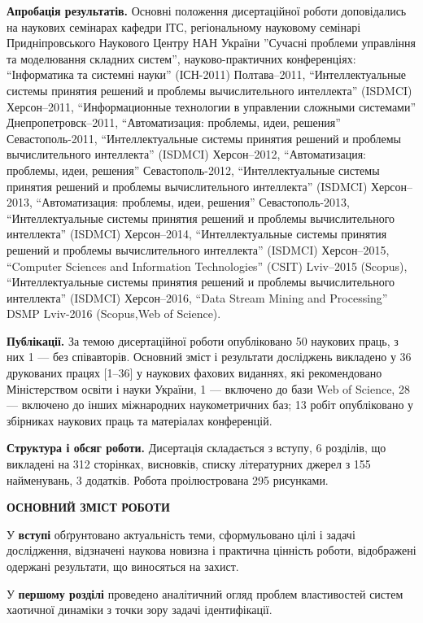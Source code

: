 \documentclass[a4paper,13pt]{atuaref}
\newcommand{\xsect}[1]{\vspace{0.15ex}\begin{center}\textbf{#1}\end{center}\vspace{4pt}\penalty10000}
\begin{document}
\smallskip
\textbf{Апробація результатів.}
Основні положення дисертаційної роботи доповідались на наукових
семінарах кафедри ІТС,
регіональному науковому семінарі Придніпровського Наукового Центру НАН України
''Сучасні проблеми управління та моделювання складних систем'',
науково-практичних конференціях:
``Інформатика та системні науки'' (ІСН-2011) Полтава--2011,
``Интеллектуальные системы принятия решений и проблемы вычислительного интеллекта'' (ISDMCI) Херсон--2011,
``Информационные технологии в управлении сложными системами'' Днепропетровск--2011,
``Автоматизация: проблемы, идеи, решения'' Севастополь-2011,
``Интеллектуальные системы принятия решений и проблемы вычислительного интеллекта'' (ISDMCI) Херсон--2012,
``Автоматизация: проблемы, идеи, решения'' Севастополь-2012,
``Интеллектуальные системы принятия решений и проблемы вычислительного интеллекта'' (ISDMCI) Херсон--2013,
``Автоматизация: проблемы, идеи, решения'' Севастополь-2013,
``Интеллектуальные системы принятия решений и проблемы вычислительного интеллекта'' (ISDMCI) Херсон--2014,
``Интеллектуальные системы принятия решений и проблемы вычислительного интеллекта'' (ISDMCI) Херсон--2015,
``Computer Sciences and Information Technologies'' (CSIT) Lviv--2015 (Scopus),
``Интеллектуальные системы принятия решений и проблемы вычислительного интеллекта'' (ISDMCI) Херсон--2016,
``Data Stream Mining and Processing'' DSMP Lviv-2016 (Scopus,Web of Science).

\smallskip
\textbf{Публікації.}
За темою дисертаційної роботи опубліковано
50 наукових праць, з них 1 --- без співавторів. Основний зміст і результати досліджень
викладено у 36 друкованих працях [1--36] у наукових фахових виданнях, які
рекомендовано Міністерством освіти і науки України,
1 --- включено до бази Web of Science,
28 --- включено до інших міжнародних наукометричних баз;
13 робіт опубліковано у збірниках наукових праць та матеріалах конференцій.

\smallskip
\textbf{Структура і обсяг роботи.}
Дисертація складається з вступу, 6 розділів, що викладені на
312 сторінках, висновків, списку літературних джерел з
155 найменувань,
3 додатків.
Робота проілюстрована 295 рисунками.


\xsect{ОСНОВНИЙ ЗМІСТ РОБОТИ}

У \textbf{вступі} обґрунтовано актуальність теми,
сформульовано цілі і задачі дослідження,
відзначені наукова новизна і практична цінність роботи, відображені
одержані результати, що виносяться на захист.

У \textbf{першому розділі}
проведено аналітичний огляд проблем
властивостей систем хаотичної динаміки
з точки зору задачі ідентифікації.
\end{document}
